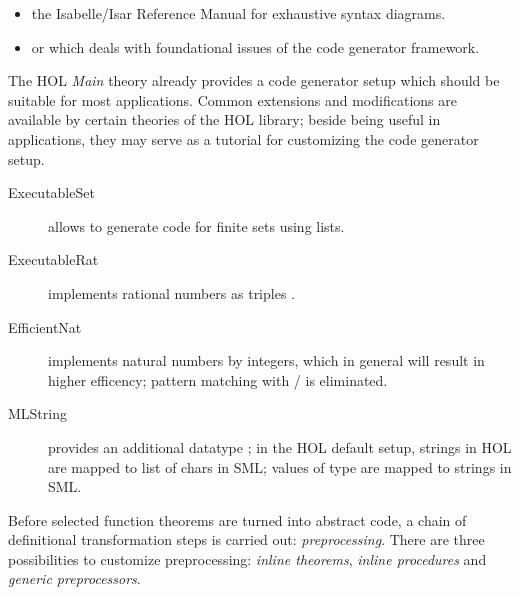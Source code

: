 \begin{isabellebody}
\begin{isamarkuptext}
  \begin{itemize}

  \item the Isabelle/Isar Reference Manual \cite{isabelle-isar-ref}
    for exhaustive syntax diagrams.
  \item or \fixme[ref] which deals with foundational issues
    of the code generator framework.

  \end{itemize}%
\end{isamarkuptext}%
\isamarkuptrue%
%
\isamarkuptrue%
%
\begin{isamarkuptext}%
The HOL \emph{Main} theory already provides a code generator setup
  which should be suitable for most applications. Common extensions
  and modifications are available by certain theories of the HOL
  library; beside being useful in applications, they may serve
  as a tutorial for customizing the code generator setup.

  \begin{description}

    \item[ExecutableSet] allows to generate code
       for finite sets using lists.
    \item[ExecutableRat] \label{exec_rat} implements rational
       numbers as triples .
    \item[EfficientNat] \label{eff_nat} implements natural numbers by integers,
       which in general will result in higher efficency; pattern
       matching with  / 
       is eliminated.
    \item[MLString] provides an additional datatype ;
       in the HOL default setup, strings in HOL are mapped to list
       of chars in SML; values of type  are
       mapped to strings in SML.

  \end{description}%
\end{isamarkuptext}%
\isamarkuptrue%
%
\isamarkuptrue%
%
\begin{isamarkuptext}%
Before selected function theorems are turned into abstract
  code, a chain of definitional transformation steps is carried
  out: \emph{preprocessing}. There are three possibilities
  to customize preprocessing: \emph{inline theorems},
  \emph{inline procedures} and \emph{generic preprocessors}.


\end{isamarkuptext}
\end{isabellebody}
